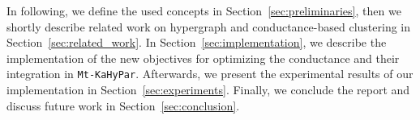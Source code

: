 \documentclass[acmsmall,nonacm,screen,review]{acmart}
\begin{document}
\noindent In following, we define the used concepts in 
Section~\ref{sec:preliminaries}, then we shortly describe related work 
on hypergraph and conductance-based clustering in 
Section~\ref{sec:related_work}. In Section~\ref{sec:implementation}, 
we describe the implementation of the new objectives for optimizing 
the conductance and their integration in \texttt{Mt-KaHyPar}. 
Afterwards, we present the experimental results of our implementation 
in Section~\ref{sec:experiments}. Finally, we conclude the report 
and discuss future work in Section~\ref{sec:conclusion}.





\end{document}
